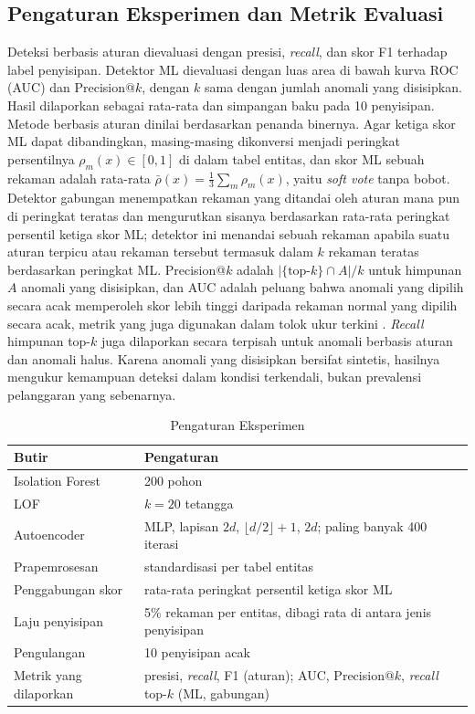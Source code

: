 \documentclass[conference]{IEEEtran}
\begin{document}
\subsection{Pengaturan Eksperimen dan Metrik Evaluasi}
Deteksi berbasis aturan dievaluasi dengan presisi, \textit{recall}, dan skor F1 terhadap label penyisipan. Detektor ML dievaluasi dengan luas area di bawah kurva ROC (AUC) dan Precision@$k$, dengan $k$ sama dengan jumlah anomali yang disisipkan. Hasil dilaporkan sebagai rata-rata dan simpangan baku pada 10 penyisipan. Metode berbasis aturan dinilai berdasarkan penanda binernya. Agar ketiga skor ML dapat dibandingkan, masing-masing dikonversi menjadi peringkat persentilnya $\rho_m(x)\in[0,1]$ di dalam tabel entitas, dan skor ML sebuah rekaman adalah rata-rata $\bar{\rho}(x)=\frac{1}{3}\sum_{m}\rho_m(x)$, yaitu \textit{soft vote} tanpa bobot. Detektor gabungan menempatkan rekaman yang ditandai oleh aturan mana pun di peringkat teratas dan mengurutkan sisanya berdasarkan rata-rata peringkat persentil ketiga skor ML; detektor ini menandai sebuah rekaman apabila suatu aturan terpicu atau rekaman tersebut termasuk dalam $k$ rekaman teratas berdasarkan peringkat ML. Precision@$k$ adalah $|\{\text{top-}k\}\cap A|/k$ untuk himpunan $A$ anomali yang disisipkan, dan AUC adalah peluang bahwa anomali yang dipilih secara acak memperoleh skor lebih tinggi daripada rekaman normal yang dipilih secara acak, metrik yang juga digunakan dalam tolok ukur terkini \cite{han2022adbench}. \textit{Recall} himpunan top-$k$ juga dilaporkan secara terpisah untuk anomali berbasis aturan dan anomali halus. Karena anomali yang disisipkan bersifat sintetis, hasilnya mengukur kemampuan deteksi dalam kondisi terkendali, bukan prevalensi pelanggaran yang sebenarnya.


\begin{table}[htbp]
\caption{Pengaturan Eksperimen}
\begin{center}
\begin{tabular}{L{0.34\columnwidth}L{0.54\columnwidth}}
\toprule
\textbf{Butir} & \textbf{Pengaturan} \\
\midrule
Isolation Forest & 200 pohon \\
LOF & $k=20$ tetangga \\
Autoencoder & MLP, lapisan $2d$, $\lfloor d/2\rfloor+1$, $2d$; paling banyak 400 iterasi \\
Prapemrosesan & standardisasi per tabel entitas \\
Penggabungan skor & rata-rata peringkat persentil ketiga skor ML \\
Laju penyisipan & 5\% rekaman per entitas, dibagi rata di antara jenis penyisipan \\
Pengulangan & 10 penyisipan acak \\
Metrik yang dilaporkan & presisi, \textit{recall}, F1 (aturan); AUC, Precision@$k$, \textit{recall} top-$k$ (ML, gabungan) \\
\bottomrule
\end{tabular}
\label{tab:settings}
\end{center}
\end{table}
\end{document}
